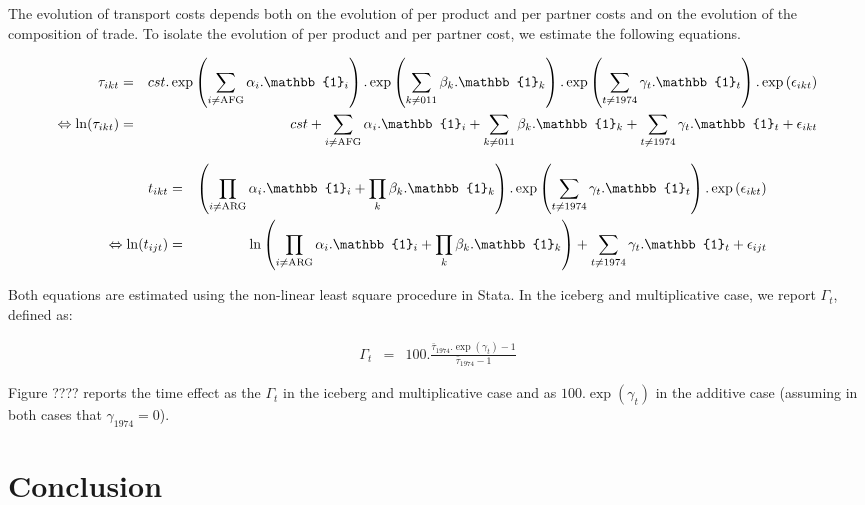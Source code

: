 \documentclass[a4paper,11pt]{article}
\begin{document}
The evolution of transport costs depends both on the evolution of per product and per partner costs and on the evolution of the composition of trade. To isolate the evolution of per product and per partner cost, we estimate the following equations.

\begin{eqnarray}
\tau_{ikt}&=&cst.\exp\left(\sum_{i \neq \text{AFG}}\alpha_i.\mathbb{1}_i\right).\exp\left(\sum_{k\neq \text{011}}\beta_k.\mathbb{1}_k\right).\exp\left(\sum_{t \neq 1974}\gamma_t.\mathbb{1}_t\right) .\exp\left(\epsilon_{ikt}\right) \notag \\
\Leftrightarrow \ln(\tau_{ikt})&=&cst+\sum_{i \neq \text{AFG}}\alpha_i.\mathbb{1}_i + \sum_{k\neq \text{011}}\beta_k.\mathbb{1}_k + \sum_{t \neq 1974}\gamma_t.\mathbb{1}_t+\epsilon_{ikt}
\end{eqnarray}

\begin{eqnarray}
t_{ikt}&=&\left( \prod_{i \neq \text{ARG}}  \alpha_i.\mathbb{1}_i+\prod_k\beta_k.\mathbb{1}_k\right).\exp\left(\sum_{t \neq 1974}\gamma_t.\mathbb{1}_t\right) .\exp\left(\epsilon_{ikt}\right) \notag \\
\Leftrightarrow \ln(t_{ijt})&=&\ln\left( \prod_{i \neq \text{ARG}}  \alpha_i.\mathbb{1}_i+\prod_k\beta_k.\mathbb{1}_k\right) + \sum_{t \neq 1974}\gamma_t.\mathbb{1}_t+\epsilon_{ijt}
\end{eqnarray}

Both equations are estimated using the non-linear least square procedure in Stata.
In the iceberg and multiplicative case, we report $\Gamma_t$, defined as:

\begin{eqnarray}
\Gamma_t &=& 100.\frac {\bar{\tau}_{1974}.\exp(\gamma_t)-1} {\bar{\tau}_{1974}-1}
\end{eqnarray}




Figure ???? reports the time effect as the $\Gamma_t$ in the iceberg and multiplicative case and as $100.\exp(\gamma_t)$ in the additive case (assuming in both cases that $\gamma_{1974}=0$).




\section{Conclusion \label{sec:conclu}}

\newpage




\newpage
\end{document}
